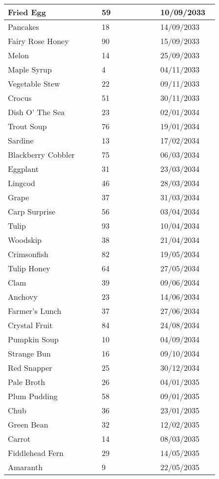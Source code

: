 \documentclass{article}
\begin{document}
\begin{longtable}{|p{0.4\linewidth}|p{0.25\linewidth}|p{0.25\linewidth}|}
\hline
Fried Egg & 59 & 10/09/2033 \\
\hline
Pancakes & 18 & 14/09/2033 \\
\hline
Fairy Rose Honey & 90 & 15/09/2033 \\
\hline
Melon & 14 & 25/09/2033 \\
\hline
Maple Syrup & 4 & 04/11/2033 \\
\hline
Vegetable Stew & 22 & 09/11/2033 \\
\hline
Crocus & 51 & 30/11/2033 \\
\hline
Dish O' The Sea & 23 & 02/01/2034 \\
\hline
Trout Soup & 76 & 19/01/2034 \\
\hline
Sardine & 13 & 17/02/2034 \\
\hline
Blackberry Cobbler & 75 & 06/03/2034 \\
\hline
Eggplant & 31 & 23/03/2034 \\
\hline
Lingcod & 46 & 28/03/2034 \\
\hline
Grape & 37 & 31/03/2034 \\
\hline
Carp Surprise & 56 & 03/04/2034 \\
\hline
Tulip & 93 & 10/04/2034 \\
\hline
Woodskip & 38 & 21/04/2034 \\
\hline
Crimsonfish & 82 & 19/05/2034 \\
\hline
Tulip Honey & 64 & 27/05/2034 \\
\hline
Clam & 39 & 09/06/2034 \\
\hline
Anchovy & 23 & 14/06/2034 \\
\hline
Farmer's Lunch & 37 & 27/06/2034 \\
\hline
Crystal Fruit & 84 & 24/08/2034 \\
\hline
Pumpkin Soup & 10 & 04/09/2034 \\
\hline
Strange Bun & 16 & 09/10/2034 \\
\hline
Red Snapper & 25 & 30/12/2034 \\
\hline
Pale Broth & 26 & 04/01/2035 \\
\hline
Plum Pudding & 58 & 09/01/2035 \\
\hline
Chub & 36 & 23/01/2035 \\
\hline
Green Bean & 32 & 12/02/2035 \\
\hline
Carrot & 14 & 08/03/2035 \\
\hline
Fiddlehead Fern & 29 & 14/05/2035 \\
\hline
Amaranth & 9 & 22/05/2035 \\
\hline

\end{longtable}
\end{document}
